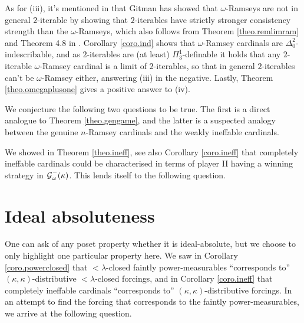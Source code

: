\documentclass[../../main]{subfiles}
\begin{document}
\qquad As for (iii), it's mentioned in \cite{HolySchlicht} that Gitman has showed that $\omega$-Ramseys are not in general $2$-iterable by showing that $2$-iterables have strictly stronger consistency strength than the $\omega$-Ramseys, which also follows from Theorem \ref{theo.remlimram} and Theorem 4.8 in \cite{Ramsey2}. Corollary \ref{coro.ind} shows that $\omega$-Ramsey cardinals are $\Delta^2_0$-indescribable, and as $2$-iterables are (at least) $\Pi^1_3$-definable it holds that any $2$-iterable $\omega$-Ramsey cardinal is a limit of $2$-iterables, so that in general $2$-iterables can't be $\omega$-Ramsey either, answering (iii) in the negative. Lastly, Theorem \ref{theo.omegaplusone} gives a positive answer to (iv).

\qquad We conjecture the following two questions to be true. The first is a direct analogue to Theorem \ref{theo.gengame}, and the latter is a suspected analogy between the genuine $n$-Ramsey cardinals and the weakly ineffable cardinals.



We showed in Theorem \ref{theo.ineff}, see also Corollary \ref{coro.ineff} that completely ineffable cardinals could be characterised in terms of player II having a winning strategy in $\operatorname{\mathcal G}_\omega^-(\kappa)$. This lends itself to the following question.



\section{Ideal absoluteness}

One can ask of any poset property whether it is ideal-absolute, but we choose to only highlight one particular property here. We saw in Corollary \ref{coro.powerclosed} that ${<}\lambda$-closed faintly power-measurables ``corresponds to'' $(\kappa,\kappa)$-distributive ${<}\lambda$-closed forcings, and in Corollary \ref{coro.ineff} that completely ineffable cardinals ``corresponds to'' $(\kappa,\kappa)$-distributive forcings. In an attempt to find the forcing that corresponds to the faintly power-measurables, we arrive at the following question.
\end{document}
